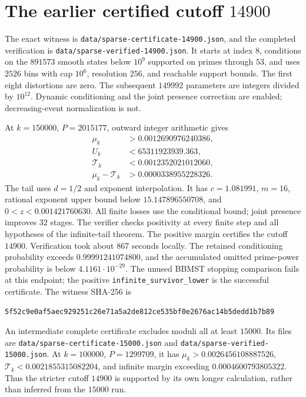 \documentclass[11pt]{article}
\begin{document}
\section{The earlier certified cutoff $14900$}\label{sec:latest}
The exact witness is \texttt{data/sparse-certificate-14900.json}, and the
completed verification is \texttt{data/sparse-verified-14900.json}.
It starts at index $8$, conditions on the $891573$ smooth states below
$10^9$ supported on primes through $53$, and uses $2526$ bins with
cap $10^6$, resolution $256$, and reachable support bounds.
The first eight distortions are zero. The subsequent $149992$ parameters
are integers divided by $10^{12}$. Dynamic conditioning and the joint
presence correction are enabled; decreasing-event normalization is not.

At $k=150000$, $P=2015177$, outward integer arithmetic gives
\begin{align*}
 \mu_k&>0.0012690976240386,\\
 U_k&<65311923939.363,\\
 \mathcal T_k&<0.0012352021012060,\\
 \mu_k-\mathcal T_k&>0.0000338955228326.
\end{align*}
The tail uses $d=1/2$ and exponent interpolation. It has $c=1.081991$,
$m=16$, rational exponent upper bound below $15.147896550708$, and
$0<z<0.001421760630$. All finite losses
use the conditional bound; joint presence improves $32$ stages.
The verifier checks positivity at every finite step and all hypotheses
of the infinite-tail theorem. The positive margin certifies the cutoff
$14900$. Verification took about $867$ seconds locally.
The retained conditioning probability exceeds $0.99991241074800$, and
the accumulated omitted prime-power probability is below $4.1161\cdot10^{-29}$.
The unused BBMST stopping comparison fails at this endpoint; the positive
\texttt{infinite\_survivor\_lower} is the successful certificate.
The witness SHA-256 is
\begin{lstlisting}[basicstyle=\ttfamily\scriptsize,breaklines=true]
5f52c9e0af5aec929251c26e71a5a2de812ce535bf0e2676ac14b5dedd1b7b89
\end{lstlisting}

An intermediate complete certificate excludes moduli all at least $15000$.
Its files are \texttt{data/sparse-certificate-15000.json} and
\texttt{data/sparse-verified-15000.json}. At $k=100000$, $P=1299709$,
it has $\mu_k>0.0026456108887526$,
$\mathcal T_k<0.0021855315082204$, and infinite margin exceeding
$0.0004600793805322$. Thus the stricter cutoff $14900$ is supported by
its own longer calculation, rather than inferred from the $15000$ run.
\end{document}
